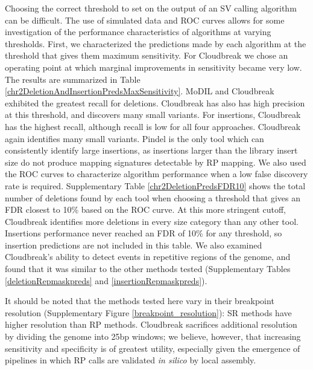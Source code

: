 \documentclass[11pt]{article}
\begin{document}
Choosing the correct threshold to set on the output of an SV calling algorithm can be difficult. The use of simulated data and ROC curves allows for some investigation of the performance characteristics of algorithms at varying thresholds. First, we characterized the predictions made by each algorithm at the threshold that gives them maximum sensitivity. For Cloudbreak we chose an operating point at which marginal improvements in sensitivity became very low. The results are summarized in Table \ref{chr2DeletionAndInsertionPredsMaxSensitivity}. MoDIL and Cloudbreak exhibited the greatest recall for deletions. Cloudbreak has also has high precision at this threshold, and discovers many small variants. For insertions, Cloudbreak has the highest recall, although recall is low for all four approaches. Cloudbreak again identifies many small variants. Pindel is the only tool which can consistently identify large insertions, as insertions larger than the library insert size do not produce mapping signatures detectable by RP mapping. We also used the ROC curves to characterize algorithm performance when a low false discovery rate is required. Supplementary Table \ref{chr2DeletionPredsFDR10} shows the total number of deletions found by each tool when choosing a threshold that gives an FDR closest to 10\% based on the ROC curve. At this more stringent cutoff, Cloudbreak identifies more deletions in every size category than any other tool. Insertions performance never reached an FDR of 10\% for any threshold, so insertion predictions are not included in this table. We also examined Cloudbreak's ability to detect events in repetitive regions of the genome, and found that it was similar to the other methods tested (Supplementary Tables \ref{deletionRepmaskpreds} and \ref{insertionRepmaskpreds}).

It should be noted that the methods tested here vary in their breakpoint resolution (Supplementary Figure \ref{breakpoint_resolution}): SR methods have higher resolution than RP methods. Cloudbreak sacrifices additional resolution by dividing the genome into 25bp windows; we believe, however, that increasing sensitivity and specificity is of greatest utility, especially given the emergence of pipelines in which RP calls are validated \emph{in silico} by local assembly.
\end{document}
